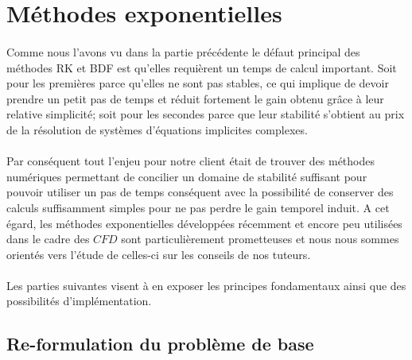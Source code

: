 \section{Méthodes exponentielles}

\paragraph{}
Comme nous l'avons vu dans la partie précédente le défaut principal des méthodes RK et BDF est qu'elles requièrent un temps de calcul important. Soit pour les premières parce qu'elles ne sont pas stables, ce qui implique de devoir prendre un petit pas de temps et réduit fortement le gain obtenu grâce à leur relative simplicité; soit pour les secondes parce que leur stabilité s'obtient au prix de la résolution de systèmes d'équations implicites complexes.

\paragraph{}
Par conséquent tout l'enjeu pour notre client était de trouver des méthodes numériques permettant de concilier un domaine de stabilité suffisant pour pouvoir utiliser un pas de temps conséquent avec la possibilité de conserver des calculs suffisamment simples pour ne pas perdre le gain temporel induit.
A cet égard, les méthodes exponentielles développées récemment et encore peu utilisées dans le cadre des $CFD$ sont particulièrement prometteuses et nous nous sommes orientés vers l'étude de celles-ci sur les conseils de nos tuteurs.

\paragraph{}
Les parties suivantes visent à en exposer les principes fondamentaux ainsi que des possibilités d'implémentation.


\subsection{Re-formulation du problème de base}

